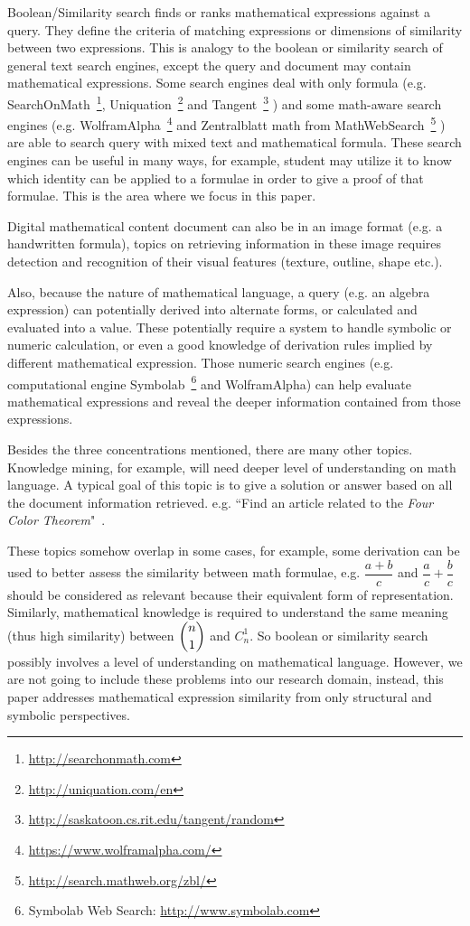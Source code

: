 Boolean/Similarity search finds or ranks mathematical expressions against a query. 
They define the criteria of matching expressions or dimensions of similarity between two expressions.
This is analogy to the boolean or similarity search of general text search engines,
except the query and document may contain mathematical expressions. 
Some search engines deal with only formula (e.g. 
SearchOnMath~\footnote{\url{http://searchonmath.com}},
Uniquation~\footnote{\url{http://uniquation.com/en}}
and 
Tangent~\footnote{\url{http://saskatoon.cs.rit.edu/tangent/random}}
) 
and some math-aware search engines (e.g.
WolframAlpha~\footnote{\url{https://www.wolframalpha.com/}} and 
Zentralblatt math from MathWebSearch~\footnote{\url{http://search.mathweb.org/zbl/}}
)
are able to search query with mixed text and mathematical formula.
These search engines can be useful in many ways, for example, student may utilize it to know which identity can be applied to a formulae in order to give a proof of that formulae.
This is the area where we focus in this paper. 

Digital mathematical content document can also be in an image format (e.g. a handwritten formula), topics on retrieving information in these image requires detection and recognition of their visual features (texture, outline, shape etc.).

Also, because the nature of mathematical language, a query (e.g. an algebra expression) can potentially derived into alternate forms, or calculated and evaluated into a value. 
These potentially require a system to handle symbolic or numeric calculation, or even a good knowledge of derivation rules implied by different mathematical expression. 
Those numeric search engines
(e.g. computational engine Symbolab~\footnote{Symbolab Web Search: \url{http://www.symbolab.com}} and WolframAlpha)
can help evaluate mathematical expressions and reveal the deeper information contained from those expressions.

Besides the three concentrations mentioned, there are many other topics. Knowledge mining, for example, will need deeper level of understanding on math language. A typical goal of this topic is to give a solution or answer based on all the document information retrieved. e.g. ``Find an article related to the \textit{Four Color Theorem}"~\cite{ntcirtopic}.

These topics somehow overlap in some cases, for example, some derivation can be used to better assess the similarity between math formulae, e.g. $\dfrac{a + b}{c}$ and $\dfrac{a}{c} + \dfrac{b}{c}$ should be considered as relevant because their equivalent form of representation.
Similarly, mathematical knowledge is required to understand the same meaning (thus high similarity) between $ \dbinom n 1 $ and $C_n^1$.
So boolean or similarity search possibly involves a level of understanding on mathematical language. 
However, we are not going to include these problems into our research domain, instead, this paper addresses mathematical expression similarity from only structural and symbolic perspectives.


